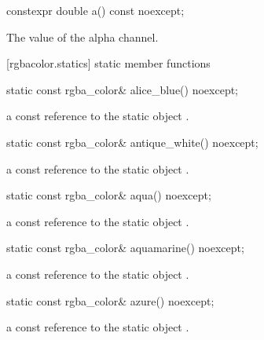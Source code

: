 \begin{itemdecl}
constexpr double a() const noexcept;
\end{itemdecl}
\begin{itemdescr}
\pnum
\returns
The value of the alpha channel.
\end{itemdescr}

 [rgbacolor.statics] { static member functions}

\begin{itemdecl}
static const rgba_color& alice_blue() noexcept;
\end{itemdecl}
\begin{itemdescr}
\pnum
\returns
a const reference to the static  object .
\end{itemdescr}

\begin{itemdecl}
static const rgba_color& antique_white() noexcept;
\end{itemdecl}
\begin{itemdescr}
\pnum
\returns
a const reference to the static  object .
\end{itemdescr}

\begin{itemdecl}
static const rgba_color& aqua() noexcept;
\end{itemdecl}
\begin{itemdescr}
\pnum
\returns
a const reference to the static  object .
\end{itemdescr}

\begin{itemdecl}
static const rgba_color& aquamarine() noexcept;
\end{itemdecl}
\begin{itemdescr}
\pnum
\returns
a const reference to the static  object .
\end{itemdescr}

\begin{itemdecl}
static const rgba_color& azure() noexcept;
\end{itemdecl}
\begin{itemdescr}
\pnum
\returns
a const reference to the static  object .
\end{itemdescr}

